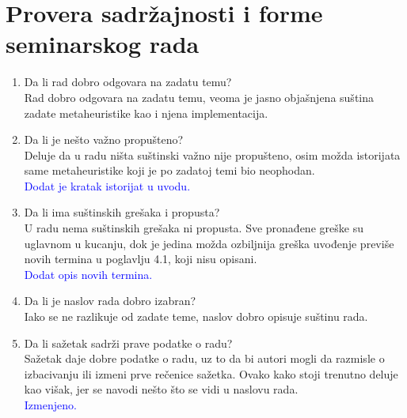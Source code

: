\documentclass[a4paper]{report}
\newcommand{\odgovor}[1]{\textcolor{blue}{#1}}
\begin{document}
\section{Provera sadržajnosti i forme seminarskog rada}

\begin{enumerate}
\item Da li rad dobro odgovara na zadatu temu?\\
Rad dobro odgovara na zadatu temu, veoma je jasno objašnjena suština zadate metaheuristike kao i njena implementacija.

\item Da li je nešto važno propušteno?\\
Deluje da u radu ništa suštinski važno nije propušteno, osim možda istorijata same metaheuristike koji je po zadatoj temi bio neophodan.\\
\odgovor{Dodat je kratak istorijat u uvodu.\\}

\item Da li ima suštinskih grešaka i propusta?\\
U radu nema suštinskih grešaka ni propusta. Sve pronađene greške su uglavnom u kucanju, dok je jedina možda ozbiljnija greška uvođenje previše novih termina u poglavlju 4.1, koji nisu opisani.
\\ \odgovor{Dodat opis novih termina.\\}
\item Da li je naslov rada dobro izabran?\\
Iako se ne razlikuje od zadate teme, naslov dobro opisuje suštinu rada.

\item Da li sažetak sadrži prave podatke o radu?\\
Sažetak daje dobre podatke o radu, uz to da bi autori mogli da razmisle o izbacivanju ili izmeni prve rečenice sažetka. Ovako kako stoji trenutno deluje kao višak, jer se navodi nešto što se vidi u naslovu rada.\\
\odgovor{Izmenjeno.\\} 


\end{enumerate}
\end{document}
